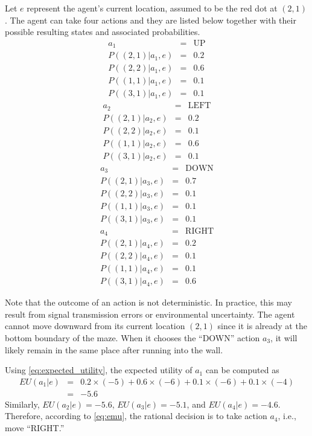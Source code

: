 Let $e$ represent the agent’s current location, assumed to be the red dot at $(2,1)$. The agent can take four actions and they are listed below together with their possible resulting states and associated probabilities.
\begin{eqnarray}
	a_1 &=& \mathrm{UP} \nonumber \\
	P((2,1)|a_1,e) &=& 0.2 \nonumber \\
	P((2,2)|a_1,e) &=& 0.6 \nonumber \\
	P((1,1)|a_1,e) &=& 0.1 \nonumber \\
	P((3,1)|a_1,e) &=& 0.1 \nonumber
\end{eqnarray}
\begin{eqnarray}
	a_2 &=& \mathrm{LEFT} \nonumber \\
	P((2,1)|a_2,e) &=& 0.2 \nonumber \\
	P((2,2)|a_2,e) &=& 0.1 \nonumber \\
	P((1,1)|a_2,e) &=& 0.6 \nonumber \\
	P((3,1)|a_2,e) &=& 0.1 \nonumber
\end{eqnarray}
\begin{eqnarray}
	a_3 &=& \mathrm{DOWN} \nonumber \\
	P((2,1)|a_3,e) &=& 0.7 \nonumber \\
	P((2,2)|a_3,e) &=& 0.1 \nonumber \\
	P((1,1)|a_3,e) &=& 0.1 \nonumber \\
	P((3,1)|a_3,e) &=& 0.1 \nonumber
\end{eqnarray}
\begin{eqnarray}
	a_4 &=& \mathrm{RIGHT} \nonumber \\
	P((2,1)|a_4,e) &=& 0.2 \nonumber \\
	P((2,2)|a_4,e) &=& 0.1 \nonumber \\
	P((1,1)|a_4,e) &=& 0.1 \nonumber \\
	P((3,1)|a_4,e) &=& 0.6 \nonumber
\end{eqnarray}

Note that the outcome of an action is not deterministic. In practice, this may result from signal transmission errors or environmental uncertainty. The agent cannot move downward from its current location $(2,1)$ since it is already at the bottom boundary of the maze. When it chooses the ``DOWN'' action $a_3$, it will likely remain in the same place after running into the wall.

Using \eqref{eq:expected_utility}, the expected utility of $a_1$ can be computed as
\begin{eqnarray}
	EU(a_1|e) &=& 0.2 \times (-5) + 0.6 \times (-6) + 0.1 \times (-6) + 0.1 \times (-4) \nonumber \\
	&=& -5.6 \nonumber
\end{eqnarray}
Similarly, $EU(a_2|e) = -5.6$, $EU(a_3|e) = -5.1$, and $EU(a_4|e) = -4.6$. Therefore, according to \eqref{eq:emu}, the rational decision is to take action $a_4$, i.e., move “RIGHT.”

